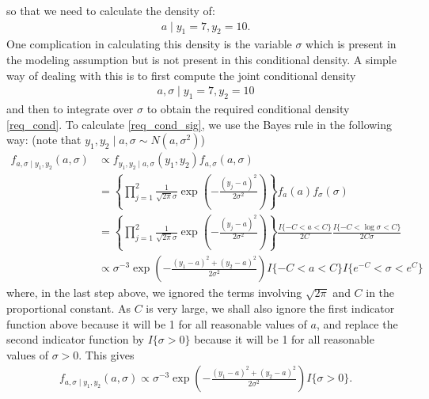 \documentclass{scrartcl}
\begin{document}
so that we need to calculate the density of:
\begin{align}\label{req_cond}
  a \mid y_1 = 7, y_2 = 10. 
\end{align}
One complication in calculating this density is the variable $\sigma$
which is present in the modeling assumption but is not present in this
conditional density. A simple way of dealing with this is to first
compute the joint conditional density
\begin{align}\label{req_cond_sig}
  a, \sigma \mid y_1 = 7, y_2 = 10
\end{align}
and then to integrate over $\sigma$ to obtain the required conditional
density \eqref{req_cond}. To calculate \eqref{req_cond_sig}, we use
the Bayes rule in the following way: (note that $y_1, y_2 \mid a,
\sigma \sim N(a, \sigma^2)$)
\begin{align*}
  f_{a, \sigma \mid y_1, y_2}(a, \sigma) &\propto
                                                         f_{y_1, y_2
                                                         \mid a,
                                                         \sigma}(y_1,  y_2)
                                                         f_{a,
                                                         \sigma}(a,
                                                         \sigma) \\
  &= \left\{\prod_{j=1}^2
  \frac{1}{\sqrt{2\pi}\sigma}
  \exp\left(-\frac{(y_j-a)^2}{2\sigma^2}\right)\right\} f_a(a)
    f_{\sigma}(\sigma) \\
  &= \left\{\prod_{j=1}^2
  \frac{1}{\sqrt{2\pi}\sigma}
  \exp\left(-\frac{(y_j-a)^2}{2\sigma^2}\right)\right\} \frac{I\{-C <
    a < C\}}{2 C} \frac{I\{-C < \log \sigma < C\}}{2 C \sigma} \\
  &\propto \sigma^{-3} \exp \left(-\frac{(y_1 - a)^2 + (y_2 - a)^2}{2
    \sigma^2} \right) I\{-C < a < C\} I\{e^{-C} < \sigma < e^C\}
\end{align*}
where, in the last step above, we ignored the terms involving
$\sqrt{2\pi}$ and $C$ in the proportional constant. As $C$ is
very large, we shall also ignore the first indicator function above because
it will be 1 for all reasonable values of $a$, and replace the second
indicator function by $I\{\sigma > 0\}$ because it will be 1 for all
reasonable values of $\sigma > 0$. This gives
\begin{align*}
  f_{a, \sigma \mid y_1, y_2}(a, \sigma) \propto \sigma^{-3} \exp \left(-\frac{(y_1 - a)^2 + (y_2 - a)^2}{2
    \sigma^2} \right) I\{\sigma > 0\}. 
\end{align*}
\end{document}
